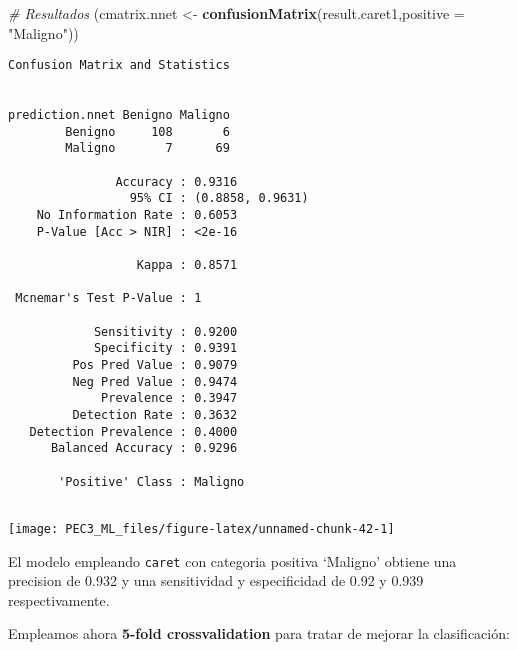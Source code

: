 \documentclass[
]{article}
\newenvironment{Shaded}{\begin{snugshade}}{\end{snugshade}}
\newcommand{\CommentTok}[1]{\textcolor[rgb]{0.56,0.35,0.01}{\textit{#1}}}
\newcommand{\DataTypeTok}[1]{\textcolor[rgb]{0.13,0.29,0.53}{#1}}
\newcommand{\KeywordTok}[1]{\textcolor[rgb]{0.13,0.29,0.53}{\textbf{#1}}}
\newcommand{\NormalTok}[1]{#1}
\newcommand{\StringTok}[1]{\textcolor[rgb]{0.31,0.60,0.02}{#1}}
\begin{document}
\begin{Shaded}
\begin{Highlighting}[]
\CommentTok{# Resultados}
\NormalTok{(cmatrix.nnet <-}\StringTok{ }\KeywordTok{confusionMatrix}\NormalTok{(result.caret1,}\DataTypeTok{positive =} \StringTok{"Maligno"}\NormalTok{))}
\end{Highlighting}
\end{Shaded}

\begin{verbatim}
Confusion Matrix and Statistics

               
prediction.nnet Benigno Maligno
        Benigno     108       6
        Maligno       7      69
                                          
               Accuracy : 0.9316          
                 95% CI : (0.8858, 0.9631)
    No Information Rate : 0.6053          
    P-Value [Acc > NIR] : <2e-16          
                                          
                  Kappa : 0.8571          
                                          
 Mcnemar's Test P-Value : 1               
                                          
            Sensitivity : 0.9200          
            Specificity : 0.9391          
         Pos Pred Value : 0.9079          
         Neg Pred Value : 0.9474          
             Prevalence : 0.3947          
         Detection Rate : 0.3632          
   Detection Prevalence : 0.4000          
      Balanced Accuracy : 0.9296          
                                          
       'Positive' Class : Maligno         
                                          
\end{verbatim}

\begin{center}\texttt{[image: PEC3\_ML\_files/figure-latex/unnamed-chunk-42-1]} \end{center}

El modelo empleando \texttt{caret} con categoria positiva `Maligno'
obtiene una precision de 0.932 y una sensitividad y especificidad de
0.92 y 0.939 respectivamente.

Empleamos ahora \textbf{5-fold crossvalidation} para tratar de mejorar
la clasificación:
\end{document}
